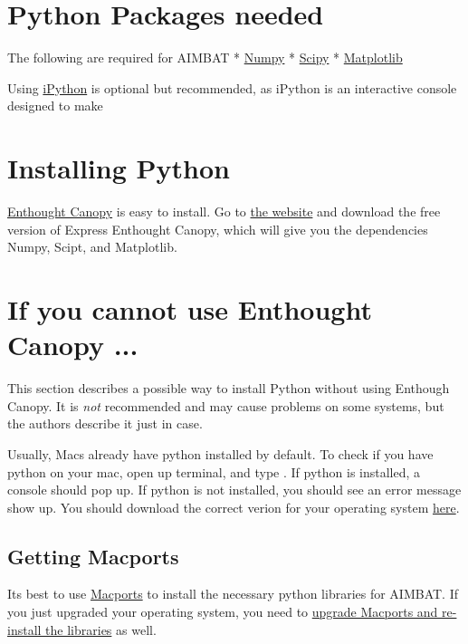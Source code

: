 \documentclass[letterpaper,10pt,english]{sphinxmanual}
\begin{document}
\section{Python Packages needed}
\label{docfiles/install_dependencies:python-packages-needed}
The following are required for AIMBAT
* \href{http://www.numpy.org/}{Numpy}
* \href{http://www.scipy.org/}{Scipy}
* \href{http://matplotlib.org/}{Matplotlib}

Using \href{http://ipython.org/}{iPython} is optional but recommended, as iPython is an interactive console designed to make


\section{Installing Python}
\label{docfiles/install_dependencies:installing-python}
\href{https://www.enthought.com/store/}{Enthought Canopy} is easy to install. Go to \href{https://www.enthought.com/store/}{the website} and download the free version of Express Enthought Canopy, which will give you the dependencies Numpy, Scipt, and Matplotlib.


\section{If you cannot use Enthought Canopy ...}
\label{docfiles/install_dependencies:if-you-cannot-use-enthought-canopy}
This section describes a possible way to install Python without using Enthough Canopy. It is \emph{not} recommended and may cause problems on some systems, but the authors describe it just in case.

Usually, Macs already have python installed by default. To check if you have python on your mac, open up terminal, and type . If python is installed, a console should pop up. If python is not installed, you should see an error message show up. You should download the correct verion for your operating system \href{https://www.python.org/}{here}.


\subsection{Getting Macports}
\label{docfiles/install_dependencies:getting-macports}
Its best to use \href{http://guide.macports.org/}{Macports} to install the necessary python libraries for AIMBAT. If you just upgraded your operating system, you need to \href{https://trac.macports.org/wiki/Migration}{upgrade Macports and re-install the libraries} as well.
\end{document}
